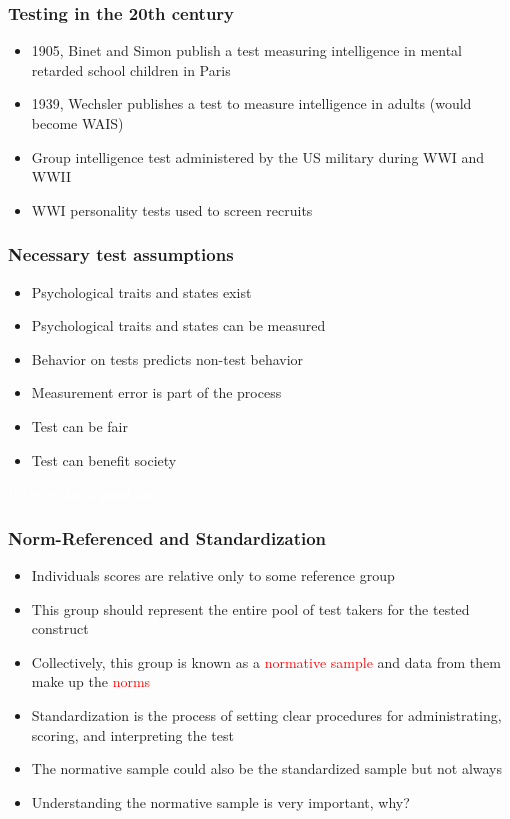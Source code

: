 \documentclass[dvipsnames]{beamer}\usepackage[]{graphicx}\usepackage[]{color}
\begin{document}
\begin{frame}
\frametitle{Testing in the 20th century}
\begin{itemize}
\item 1905, Binet and Simon publish a test measuring intelligence in mental retarded school children in Paris
\item 1939, Wechsler publishes a test to measure intelligence in adults (would become WAIS)
\item Group intelligence test administered by the US military during WWI and WWII
\item WWI personality tests used to screen recruits
\end{itemize}
\end{frame}

\begin{frame}
\frametitle{Necessary test assumptions}
\begin{itemize}
\item<1-> Psychological traits and states exist
\item<2-> Psychological traits and states can be measured
\item<3-> Behavior on tests predicts non-test behavior
\item<4-> Measurement error is part of the process
\item<5-> Test can be fair
\item<6-> Test can benefit society
\end{itemize}
\end{frame}

{
\begin{frame}
\centering
\Huge \textcolor{white}{What makes a good test?}
\end{frame}
}

\begin{frame}
\frametitle{Norm-Referenced and Standardization}
\begin{itemize}
\item<1-> Individuals scores are relative only to some reference group
\item<2-> This group should represent the entire pool of test takers for the tested construct
\item<3-> Collectively, this group is known as a \textcolor{red}{normative sample} and data from them make up the \textcolor{red}{norms}
\item<4-> Standardization is the process of setting clear procedures for administrating, scoring, and interpreting the test
\item<5-> The normative sample could also be the standardized sample but not always
\item<6-> Understanding the normative sample is very important, why?
\end{itemize}
\end{frame}
\end{document}
